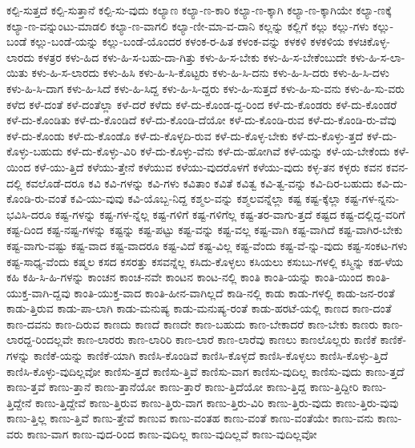 {ಕಲ್ಪಿ-ಸುತ್ತದೆ
ಕಲ್ಪಿ-ಸುತ್ತಾನೆ
ಕಲ್ಪಿ-ಸು-ವುದು
ಕಲ್ಯಾಣ
ಕಲ್ಯಾ-ಣ-ಕಾರಿ
ಕಲ್ಯಾ-ಣ-ಕ್ಕಾಗಿ
ಕಲ್ಯಾ-ಣ-ಕ್ಕಾಗಿಯೇ
ಕಲ್ಯಾ-ಣಕ್ಕೆ
ಕಲ್ಯಾ-ಣ-ವನ್ನುಂಟು-ಮಾಡಲಿ
ಕಲ್ಯಾ-ಣ-ವಾಗಲಿ
ಕಲ್ಯಾ-ಣೀ-ಮಾ-ವ-ದಾನಿ
ಕಲ್ಲನ್ನು
ಕಲ್ಲಿಗೆ
ಕಲ್ಲು
ಕಲ್ಲು-ಗಳು
ಕಲ್ಲು-ಬಂಡೆ
ಕಲ್ಲು-ಬಂಡೆ-ಯನ್ನು
ಕಲ್ಲು-ಬಂಡೆ-ಯೊಂದರ
ಕಳಂಕ-ರ-ಹಿತ
ಕಳಂಕ-ವನ್ನು
ಕಳಕಳಿ
ಕಳಕಳಿಯ
ಕಳಚಿಕೊಳ್ಳ-ಲಾರದು
ಕಳತ್ರರ
ಕಳು-ಹಿದ
ಕಳು-ಹಿ-ಸ-ಬಹು-ದಾ-ಗಿತ್ತು
ಕಳು-ಹಿ-ಸ-ಬೇಕು
ಕಳು-ಹಿ-ಸ-ಬೇಕೆಂಬುದೇ
ಕಳು-ಹಿ-ಸ-ಲಾ-ಯಿತು
ಕಳು-ಹಿ-ಸ-ಲಾರದು
ಕಳು-ಹಿಸಿ
ಕಳು-ಹಿ-ಸಿ-ಕೊಟ್ಟರು
ಕಳು-ಹಿ-ಸಿ-ದನು
ಕಳು-ಹಿ-ಸಿ-ದರು
ಕಳು-ಹಿ-ಸಿ-ದಳು
ಕಳು-ಹಿ-ಸಿ-ದಾಗ
ಕಳು-ಹಿ-ಸಿದೆ
ಕಳು-ಹಿ-ಸಿದ್ದ
ಕಳು-ಹಿ-ಸಿ-ದ್ದರು
ಕಳು-ಹಿ-ಸುತ್ತದೆ
ಕಳು-ಹಿ-ಸು-ವನು
ಕಳು-ಹಿ-ಸು-ವರು
ಕಳೆದ
ಕಳೆ-ದಂತೆ
ಕಳೆ-ದಂತೆಲ್ಲಾ
ಕಳೆ-ದರೆ
ಕಳೆದು
ಕಳೆ-ದು-ಕೊಂಡ-ದ್ದ-ರಿಂದ
ಕಳೆ-ದು-ಕೊಂಡರು
ಕಳೆ-ದು-ಕೊಂಡರೆ
ಕಳೆ-ದು-ಕೊಂಡಿತು
ಕಳೆ-ದು-ಕೊಂಡಿದೆ
ಕಳೆ-ದು-ಕೊಂಡಿ-ದೆಯೋ
ಕಳೆ-ದು-ಕೊಂಡಿ-ರುವ
ಕಳೆ-ದು-ಕೊಂಡಿ-ರು-ವೆವು
ಕಳೆ-ದು-ಕೊಂಡು
ಕಳೆ-ದು-ಕೊಂಡೊ
ಕಳೆ-ದು-ಕೊಳ್ಳದಿ-ರುವ
ಕಳೆ-ದು-ಕೊಳ್ಳ-ಬೇಕು
ಕಳೆ-ದು-ಕೊಳ್ಳು-ತ್ತದೆ
ಕಳೆ-ದು-ಕೊಳ್ಳು-ಬಹುದು
ಕಳೆ-ದು-ಕೊಳ್ಳು-ವಿರಿ
ಕಳೆ-ದು-ಕೊಳ್ಳು-ವೆನು
ಕಳೆ-ದು-ಹೋಗಿವೆ
ಕಳೆ-ಯನ್ನು
ಕಳೆ-ಯ-ಬೇಕೆಂದು
ಕಳೆ-ಯಿಂದ
ಕಳೆ-ಯು-ತ್ತಿದೆ
ಕಳೆಯು-ತ್ತೇನೆ
ಕಳೆಯುವ
ಕಳೆಯು-ವುದರೊಳಗೆ
ಕಳೆಯು-ವುದು
ಕಳ್ಳ-ತನ
ಕಳ್ಳರು
ಕವನ
ಕವನ-ದಲ್ಲಿ
ಕವಲೊಡೆ-ದರೂ
ಕವಿ
ಕವಿ-ಗಳನ್ನು
ಕವಿ-ಗಳು
ಕವಿತಾಂ
ಕವಿತೆ
ಕವಿತ್ವ
ಕವಿ-ತ್ವ-ವನ್ನು
ಕವಿ-ದಿರ-ಬಹುದು
ಕವಿ-ದು-ಕೊಂಡಿ-ರು-ವಂತೆ
ಕವಿ-ಯು-ವುವು
ಕವಿ-ಯೊಬ್ಬ-ನಿದ್ದ
ಕಶ್ಮಲ-ವನ್ನು
ಕಶ್ಮಲವನ್ನೆಲ್ಲಾ
ಕಷ್ಟ
ಕಷ್ಟ-ಕ್ಕೆಲ್ಲಾ
ಕಷ್ಟ-ಗಳ-ನ್ನನು-ಭವಿಸಿ-ದರೂ
ಕಷ್ಟ-ಗಳನ್ನು
ಕಷ್ಟ-ಗಳ-ನ್ನೆಲ್ಲ
ಕಷ್ಟ-ಗಳಿಗೆ
ಕಷ್ಟ-ಗಳಿಗೆಲ್ಲ
ಕಷ್ಟ-ತರ-ವಾಗು-ತ್ತದೆ
ಕಷ್ಟದ
ಕಷ್ಟ-ದಲ್ಲಿದ್ದ-ವರಿಗೆ
ಕಷ್ಟ-ದಿಂದ
ಕಷ್ಟ-ನಷ್ಟ-ಗಳನ್ನು
ಕಷ್ಟನ್ನು
ಕಷ್ಟ-ಪಟ್ಟು
ಕಷ್ಟ-ವನ್ನು
ಕಷ್ಟ-ವಲ್ಲ
ಕಷ್ಟ-ವಾಗಿ
ಕಷ್ಟ-ವಾಗಿದೆ
ಕಷ್ಟ-ವಾಗಿರ-ಬೇಕು
ಕಷ್ಟ-ವಾಗು-ವಷ್ಟು
ಕಷ್ಟ-ವಾದ
ಕಷ್ಟ-ವಾದರೂ
ಕಷ್ಟ-ವಿದೆ
ಕಷ್ಟ-ವಿಲ್ಲ
ಕಷ್ಟ-ವೆಂದು
ಕಷ್ಟ-ವೆ-ನ್ನು-ವುದು
ಕಷ್ಟ-ಸಂಕಟ-ಗಳು
ಕಷ್ಟ-ಸಾಧ್ಯ-ವೆಂದು
ಕಷ್ಮಲ
ಕಸದ
ಕಸರತ್ತು
ಕಸವನ್ನೆಲ್ಲ
ಕಸಿದು-ಕೊಳ್ಳಲು
ಕಸಿಯಲು
ಕಸುಬು-ಗಳಲ್ಲಿ
ಕಸ್ಮಿನ್ನು
ಕಹ-ಳೆಯ
ಕಹಿ
ಕಹಿ-ಸಿ-ಹಿ-ಗಳನ್ನು
ಕಾಂಚನ
ಕಾಂಚ-ನವೇ
ಕಾಂಟನ
ಕಾಂಟ-ನಲ್ಲಿ
ಕಾಂತಿ
ಕಾಂತಿ-ಯನ್ನು
ಕಾಂತಿ-ಯಿಂದ
ಕಾಂತಿ-ಯುಕ್ತ-ವಾಗಿ-ದ್ದವು
ಕಾಂತಿ-ಯುಕ್ತ-ವಾದ
ಕಾಂತಿ-ಹೀನ-ವಾಗಿಲ್ಲದೆ
ಕಾಡಿ-ನಲ್ಲಿ
ಕಾಡು
ಕಾಡು-ಗಳಲ್ಲಿ
ಕಾಡು-ಜನ-ರಂತೆ
ಕಾಡು-ತ್ತಿರುವ
ಕಾಡು-ಪಾ-ಲಾಗಿ
ಕಾಡು-ಮನುಷ್ಯ
ಕಾಡು-ಮನುಷ್ಯ-ರಂತೆ
ಕಾಡು-ಹರಟೆ-ಯಲ್ಲಿ
ಕಾಣದ
ಕಾಣ-ದಂತೆ
ಕಾಣ-ದವನು
ಕಾಣ-ದಿರುವ
ಕಾಣದು
ಕಾಣದೆ
ಕಾಣದೇ
ಕಾಣ-ಬಹುದು
ಕಾಣ-ಬೇಕಾದರೆ
ಕಾಣ-ಬೇಕು
ಕಾಣರು
ಕಾಣ-ಲಾರದ್ದ-ರಿಂದಲ್ಲವೇ
ಕಾಣ-ಲಾರರು
ಕಾಣ-ಲಾರಿರಿ
ಕಾಣ-ಲಾರೆ
ಕಾಣ-ಲಾರೆವು
ಕಾಣಲು
ಕಾಣಲೊಲ್ಲರು
ಕಾಣಿಕೆ
ಕಾಣಿಕೆ-ಗಳನ್ನು
ಕಾಣಿಕೆ-ಯನ್ನು
ಕಾಣಿಕೆ-ಯಾಗಿ
ಕಾಣಿಸಿ-ಕೊಂಡಿವೆ
ಕಾಣಿಸಿ-ಕೊಳ್ಳದೆ
ಕಾಣಿಸಿ-ಕೊಳ್ಳಲು
ಕಾಣಿಸಿ-ಕೊಳ್ಳು-ತ್ತಿದೆ
ಕಾಣಿಸಿ-ಕೊಳ್ಳು-ವುದಿಲ್ಲವೋ
ಕಾಣಿಸು-ತ್ತದೆ
ಕಾಣಿಸು-ತ್ತಿವೆ
ಕಾಣಿಸು-ವಾಗ
ಕಾಣಿಸು-ವುದಿಲ್ಲ
ಕಾಣಿಸು-ವುದು
ಕಾಣು-ತ್ತದೆ
ಕಾಣು-ತ್ತವೆ
ಕಾಣು-ತ್ತಾನೆ
ಕಾಣು-ತ್ತಾನೆಯೋ
ಕಾಣು-ತ್ತಾರೆ
ಕಾಣು-ತ್ತಿದೆಯೋ
ಕಾಣು-ತ್ತಿದ್ದ
ಕಾಣು-ತ್ತಿದ್ದೀರಿ
ಕಾಣು-ತ್ತಿದ್ದೇನೆ
ಕಾಣು-ತ್ತಿದ್ದೇವೆ
ಕಾಣು-ತ್ತಿರುವ
ಕಾಣು-ತ್ತಿರು-ವಾಗ
ಕಾಣು-ತ್ತಿರು-ವಿರಿ
ಕಾಣು-ತ್ತಿರು-ವುದು
ಕಾಣು-ತ್ತಿರು-ವುವು
ಕಾಣು-ತ್ತಿಲ್ಲ
ಕಾಣು-ತ್ತಿವೆ
ಕಾಣು-ತ್ತೇವೆ
ಕಾಣುವ
ಕಾಣು-ವಂತಹ
ಕಾಣು-ವಂತೆ
ಕಾಣು-ವಂತೆಯೇ
ಕಾಣು-ವನು
ಕಾಣು-ವರು
ಕಾಣು-ವಾಗ
ಕಾಣು-ವುದ-ರಿಂದ
ಕಾಣು-ವುದಿಲ್ಲ
ಕಾಣು-ವುದಿಲ್ಲವೆ
ಕಾಣು-ವುದಿಲ್ಲವೋ
}
